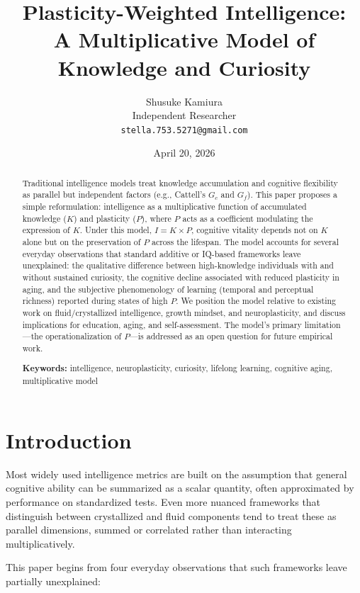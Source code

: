 \documentclass[11pt, a4paper]{article}
\title{\textbf{Plasticity-Weighted Intelligence:\\ A Multiplicative Model of Knowledge and Curiosity}}
\author{Shusuke Kamiura\\
\small Independent Researcher\\
\small \texttt{stella.753.5271@gmail.com}}
\date{April 20, 2026}
\begin{document}
\maketitle

\begin{abstract}
\noindent
Traditional intelligence models treat knowledge accumulation and cognitive flexibility as parallel but independent factors (e.g., Cattell's $G_c$ and $G_f$). This paper proposes a simple reformulation: intelligence as a multiplicative function of accumulated knowledge ($K$) and plasticity ($P$), where $P$ acts as a coefficient modulating the expression of $K$. Under this model, $I = K \times P$, cognitive vitality depends not on $K$ alone but on the preservation of $P$ across the lifespan. The model accounts for several everyday observations that standard additive or IQ-based frameworks leave unexplained: the qualitative difference between high-knowledge individuals with and without sustained curiosity, the cognitive decline associated with reduced plasticity in aging, and the subjective phenomenology of learning (temporal and perceptual richness) reported during states of high $P$. We position the model relative to existing work on fluid/crystallized intelligence, growth mindset, and neuroplasticity, and discuss implications for education, aging, and self-assessment. The model's primary limitation---the operationalization of $P$---is addressed as an open question for future empirical work.

\vspace{1em}
\noindent\textbf{Keywords:} intelligence, neuroplasticity, curiosity, lifelong learning, cognitive aging, multiplicative model
\end{abstract}

\section{Introduction}

Most widely used intelligence metrics are built on the assumption that general cognitive ability can be summarized as a scalar quantity, often approximated by performance on standardized tests. Even more nuanced frameworks that distinguish between crystallized and fluid components tend to treat these as parallel dimensions, summed or correlated rather than interacting multiplicatively.

This paper begins from four everyday observations that such frameworks leave partially unexplained:
\end{document}

